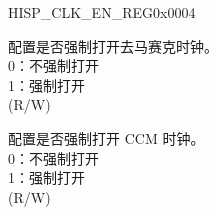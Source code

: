 \begin{register}{H}{ISP\_CLK\_EN\_REG}{0x0004}
\begin{regdesc}
\begin{reglist}
\label{fielddesc:ISPCLKDEMOSAICFORCEON}\item [ISP\_CLK\_DEMOSAIC\_FORCE\_ON] 配置是否强制打开去马赛克时钟。\\0：不强制打开\\1：强制打开\\(R/W)
\label{fielddesc:ISPCLKCCMFORCEON}\item [ISP\_CLK\_CCM\_FORCE\_ON] 配置是否强制打开 CCM 时钟。\\0：不强制打开\\1：强制打开\\(R/W)
\item [见下页...]
\end{reglist}\end{regdesc}
\end{register}

\addtocounter{Regfloat}{-1}
